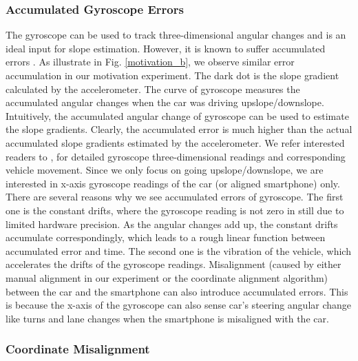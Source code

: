 \subsubsection{Accumulated Gyroscope Errors}

The gyroscope can be used to track three-dimensional angular changes
and is an ideal input for slope estimation. 
However, it is known to suffer accumulated errors \cite{zhou2014use}. 
As illustrate in Fig. \ref{motivation_b}, 
we observe similar error accumulation in our motivation experiment. 
The dark dot is the slope gradient calculated by the accelerometer.
The curve of gyroscope measures the accumulated angular changes  
when the car was driving upslope/downslope.
Intuitively, the accumulated angular change of gyroscope can be used to 
estimate the slope gradients.
Clearly, the accumulated error is much higher than 
the actual accumulated slope gradients estimated by the accelerometer. 
We refer interested readers to \cite{chen2015invisible, zhou2014use},  
for detailed gyroscope three-dimensional readings 
and corresponding vehicle movement. 
Since we only focus on going upslope/downslope, we are interested in 
x-axis gyroscope readings of the car (or aligned smartphone) only.
There are several reasons why we see accumulated errors of gyroscope. 
The first one is the constant drifts, where the gyroscope reading is 
not zero in still due to limited hardware precision.
As the angular changes add up, the constant drifts accumulate correspondingly, 
which leads to a rough linear function between accumulated error and time.
The second one is the vibration of the vehicle, which accelerates
the drifts of the gyroscope readings.
Misalignment (caused by either manual alignment in our experiment 
or the coordinate alignment algorithm) between the car and the smartphone can also introduce accumulated errors. 
This is because the x-axis of the gyroscope can also sense car's steering angular change like turns and lane changes
when the smartphone is misaligned with the car.

\subsubsection{Coordinate Misalignment}

